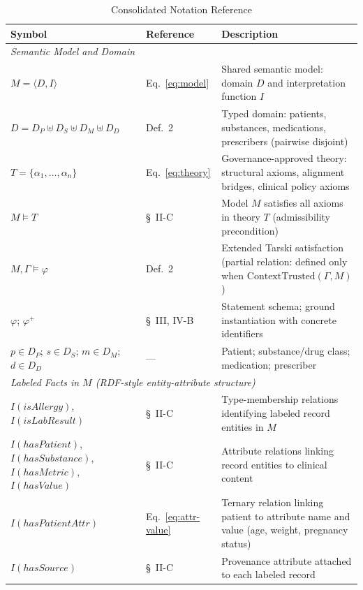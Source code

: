 \documentclass[journal]{IEEEtran}
\begin{document}
\begin{table}[!ht]
\centering
\caption{Consolidated Notation Reference}
\label{tab:notation}
\footnotesize
\renewcommand{\arraystretch}{0.95}
\begin{tabular}{p{4.5cm} p{1.4cm} p{10.5cm}}
\toprule
\textbf{Symbol} & \textbf{Reference} & \textbf{Description} \\
\midrule

\multicolumn{3}{l}{\textit{Semantic Model and Domain}} \\
$M = \langle D, I \rangle$ & Eq.~\ref{eq:model} & Shared semantic model: domain $D$ and interpretation function $I$ \\
$D = D_P \uplus D_S \uplus D_M \uplus D_D$ & Def.~2 & Typed domain: patients, substances, medications, prescribers (pairwise disjoint) \\
$T = \{\alpha_1, \ldots, \alpha_n\}$ & Eq.~\ref{eq:theory} & Governance-approved theory: structural axioms, alignment bridges, clinical policy axioms \\
$M \models T$ & \S~II-C & Model $M$ satisfies all axioms in theory $T$ (admissibility precondition) \\
$M, \Gamma \models \varphi$ & Def.~2 & Extended Tarski satisfaction (partial relation: defined only when $\mathrm{ContextTrusted}(\Gamma, M)$) \\
$\varphi$;\; $\varphi^{+}$ & \S~III, IV-B & Statement schema; ground instantiation with concrete identifiers \\
$p \in D_P$;\; $s \in D_S$;\; $m \in D_M$;\; $d \in D_D$ & --- & Patient; substance/drug class; medication; prescriber \\
\midrule

\multicolumn{3}{l}{\textit{Labeled Facts in $M$ (RDF-style entity-attribute structure)}} \\
$I(\mathit{isAllergy})$, $I(\mathit{isLabResult})$ & \S~II-C & Type-membership relations identifying labeled record entities in $M$ \\
$I(\mathit{hasPatient})$, $I(\mathit{hasSubstance})$, $I(\mathit{hasMetric})$, $I(\mathit{hasValue})$ & \S~II-C & Attribute relations linking record entities to clinical content \\
$I(\mathit{hasPatientAttr})$ & Eq.~\ref{eq:attr-value} & Ternary relation linking patient to attribute name and value (age, weight, pregnancy status) \\
$I(\mathit{hasSource})$ & \S~II-C & Provenance attribute attached to each labeled record \\
\midrule


\end{tabular}
\end{table}
\end{document}
